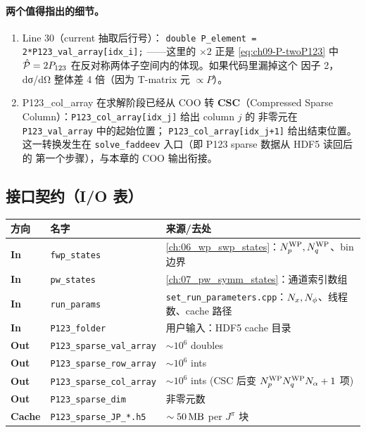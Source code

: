 \paragraph{两个值得指出的细节。}
\begin{enumerate}
\item Line 30（current 抽取后行号）：
      \verb|double P_element = 2*P123_val_array[idx_i];|
      ——这里的 \(\times 2\) 正是 \eqref{eq:ch09-P-twoP123} 中
      \(\hat{\mathcal{P}} = 2P_{123}\) 在反对称两体子空间内的体现。如果代码里漏掉这个
      因子 2，dσ/dΩ 整体差 4 倍（因为 T-matrix 元 \(\propto P\)）。
\item P123\_col\_array 在求解阶段已经从 COO 转 \textbf{CSC}（Compressed
      Sparse Column）：\verb|P123_col_array[idx_j]| 给出 column \(j\) 的
      非零元在 \texttt{P123\_val\_array} 中的起始位置；
      \verb|P123_col_array[idx_j+1]| 给出结束位置。这一转换发生在
      \texttt{solve\_faddeev} 入口（即 P123 sparse 数据从 HDF5 读回后的
      第一个步骤），与本章的 COO 输出衔接。
\end{enumerate}

\subsection{接口契约（I/O 表）}
\label{subsec:ch09-IO-contract}

\begin{center}
\renewcommand{\arraystretch}{1.18}
\begin{tabular}{lll}
\toprule
方向 & 名字 & 来源/去处 \\
\midrule
\textbf{In} & \texttt{fwp\_states} & \cref{ch:06_wp_swp_states}：\({N_{p}^{\text{WP}}}, {N_{q}^{\text{WP}}}\)、bin 边界 \\
\textbf{In} & \texttt{pw\_states}  & \cref{ch:07_pw_symm_states}：通道索引数组 \\
\textbf{In} & \texttt{run\_params} & \texttt{set\_run\_parameters.cpp}：\(N_{x}, N_{\phi}\)、线程数、cache 路径 \\
\textbf{In} & \texttt{P123\_folder} & 用户输入：HDF5 cache 目录 \\
\textbf{Out}& \texttt{P123\_sparse\_val\_array} & \(\sim 10^6\) doubles \\
\textbf{Out}& \texttt{P123\_sparse\_row\_array} & \(\sim 10^6\) ints \\
\textbf{Out}& \texttt{P123\_sparse\_col\_array} & \(\sim 10^6\) ints (CSC 后变 \({N_{p}^{\text{WP}}}{N_{q}^{\text{WP}}}N_\alpha+1\) 项) \\
\textbf{Out}& \texttt{P123\_sparse\_dim} & 非零元数 \\
\textbf{Cache}& \texttt{P123\_sparse\_JP\_*.h5} & \(\sim \SI{50}{\mega\byte}\) per \(J^\pi\) 块 \\
\bottomrule
\end{tabular}
\end{center}

